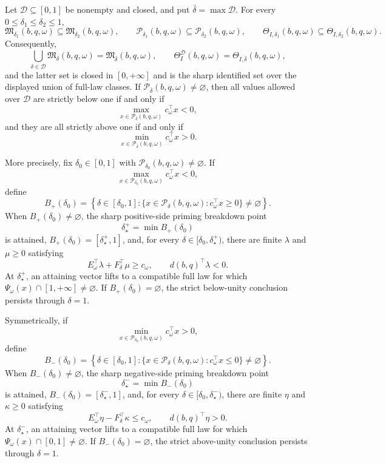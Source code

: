 Let \(\mathcal D\subseteq[0,1]\) be nonempty and closed, and put \(\bar\delta=\max\mathcal D\).  For every \(0\leq\delta_1\leq\delta_2\leq1\),
\[
 \mathfrak M_{\delta_1}(b,q,\omega)
 \subseteq \mathfrak M_{\delta_2}(b,q,\omega),\qquad
 \mathcal P_{\delta_1}(b,q,\omega)
 \subseteq \mathcal P_{\delta_2}(b,q,\omega),
 \qquad
 \Theta_{I,\delta_1}(b,q,\omega)
 \subseteq \Theta_{I,\delta_2}(b,q,\omega).
\]
Consequently,
\[
 \bigcup_{\delta\in\mathcal D}\mathfrak M_\delta(b,q,\omega)
 =\mathfrak M_{\bar\delta}(b,q,\omega),
 \qquad
 \Theta_I^{\mathcal D}(b,q,\omega)
 =\Theta_{I,\bar\delta}(b,q,\omega),
\]
and the latter set is closed in \([0,+\infty]\) and is the sharp identified set over the displayed union of full-law classes.  If \(\mathcal P_{\bar\delta}(b,q,\omega)\neq\varnothing\), then all values allowed over \(\mathcal D\) are strictly below one if and only if
\[
 \max_{x\in\mathcal P_{\bar\delta}(b,q,\omega)}c_\omega^{\top}x<0,
\]
and they are all strictly above one if and only if
\[
 \min_{x\in\mathcal P_{\bar\delta}(b,q,\omega)}c_\omega^{\top}x>0.
\]

More precisely, fix \(\delta_0\in[0,1]\) with \(\mathcal P_{\delta_0}(b,q,\omega)\neq\varnothing\).  If
\[
 \max_{x\in\mathcal P_{\delta_0}(b,q,\omega)}c_\omega^{\top}x<0,
\]
define
\[
 B_+(\delta_0)=
 \left\{\delta\in[\delta_0,1]:
 \{x\in\mathcal P_\delta(b,q,\omega):c_\omega^{\top}x\geq0\}
 \neq\varnothing\right\}.
\]
When \(B_+(\delta_0)\neq\varnothing\), the sharp positive-side priming breakdown point
\[
 \delta_\star^+=\min B_+(\delta_0)
\]
is attained, \(B_+(\delta_0)=[\delta_\star^+,1]\), and, for every \(\delta\in[\delta_0,\delta_\star^+)\), there are finite \(\lambda\) and \(\mu\geq0\) satisfying
\[
 E_\omega^{\top}\lambda+F_\delta^{\top}\mu\geq c_\omega,
 \qquad d(b,q)^{\top}\lambda<0.
\]
At \(\delta_\star^+\), an attaining vector lifts to a compatible full law for which \(\Psi_\omega(x)\cap[1,+\infty]\neq\varnothing\).  If \(B_+(\delta_0)=\varnothing\), the strict below-unity conclusion persists through \(\delta=1\).

Symmetrically, if
\[
 \min_{x\in\mathcal P_{\delta_0}(b,q,\omega)}c_\omega^{\top}x>0,
\]
define
\[
 B_-(\delta_0)=
 \left\{\delta\in[\delta_0,1]:
 \{x\in\mathcal P_\delta(b,q,\omega):c_\omega^{\top}x\leq0\}
 \neq\varnothing\right\}.
\]
When \(B_-(\delta_0)\neq\varnothing\), the sharp negative-side priming breakdown point
\[
 \delta_\star^-=\min B_-(\delta_0)
\]
is attained, \(B_-(\delta_0)=[\delta_\star^-,1]\), and, for every \(\delta\in[\delta_0,\delta_\star^-)\), there are finite \(\eta\) and \(\kappa\geq0\) satisfying
\[
 E_\omega^{\top}\eta-F_\delta^{\top}\kappa\leq c_\omega,
 \qquad d(b,q)^{\top}\eta>0.
\]
At \(\delta_\star^-\), an attaining vector lifts to a compatible full law for which \(\Psi_\omega(x)\cap[0,1]\neq\varnothing\).  If \(B_-(\delta_0)=\varnothing\), the strict above-unity conclusion persists through \(\delta=1\).

